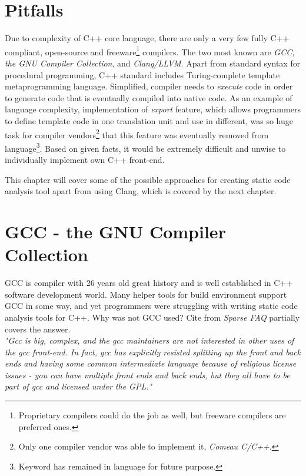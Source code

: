 \section{Pitfalls}
Due to complexity of C++ core language, there are only a very few fully C++ compliant, open-source and freeware\footnote{Proprietary compilers could do the job as well, but freeware compilers are preferred ones.} compilers. The two most known are \emph{GCC, the GNU Compiler Collection}, and \emph{Clang/LLVM}. Apart from standard syntax for procedural programming, C++ standard includes Turing-complete template metaprogramming language. Simplified, compiler needs to \textit{execute} code in order to generate code that is eventually compiled into native code. As an example of language complexity, implementation of \emph{export} feature, which allows programmers to define template code in one translation unit and use in different, was so huge task for compiler vendors\footnote{Only one compiler vendor was able to implement it, \emph{Comeau C/C++}.} that this feature was eventually removed from language\footnote{Keyword has remained in language for future purpose.}. Based on given facts, it would be extremely difficult and unwise to individually implement own C++ front-end.

This chapter will cover some of the possible approaches for creating static code analysis tool apart from using Clang, which is covered by the next chapter.

\section{GCC - the GNU Compiler Collection}
GCC is compiler with 26 years old great history and is well established in C++ software development world. Many helper tools for build environment support GCC in some way, and yet programmers were struggling with writing static code analysis tools for C++. Why was not GCC used? Cite from \emph{Sparse FAQ} \cite{sparse} partially covers the answer.\\

\textit{"Gcc is big, complex, and the gcc maintainers are not interested in other uses of the gcc front-end.  In fact, gcc has explicitly resisted splitting up the front and back ends and having some common intermediate language because of religious license issues - you can have multiple front ends and back ends, but they all have to be part of gcc and licensed under the GPL."}\\

